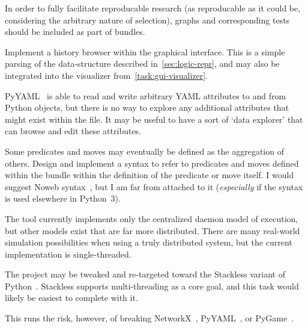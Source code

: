 \begin{task}
  \label{task:bundle-graphs}
  In order to fully facilitate reproducable research
    (as reproducable as it could be,
      considering the arbitrary nature of selection),
    graphs and corresponding tests should be included as part of bundles.
\end{task}

\begin{task}
  \label{task:save-history}
  Implement a history browser within the graphical interface.
  This is a simple parsing of the data-structure described in~\autoref{sec:logic-repr},
    and may also be integrated into the visualizer from~\autoref{task:gui-visualizer}.
\end{task}

\begin{task}
  \label{task:arbitrary-attributes}
  PyYAML~\autocite{pyyaml} is able to read and write arbitrary YAML
  attributes to and from Python objects, but there is no way to explore
  any additional attributes that might exist within the file.
  It may be useful to have a sort of \enquote*{data explorer} that can
    browse and edit these attributes.
\end{task}

\begin{task}
  \label{task:magical-references}
  Some predicates and moves may eventually be defined as the aggregation of others.
  Design and implement a syntax to refer to predicates and moves defined within the bundle
    within the definition of the predicate or move itself.
  I would suggest Noweb syntax~\autocite{noweb}, but I am far from attached to it
    (\emph{especially} if the syntax is used elsewhere in Python~3).
\end{task}

\begin{task}
  \label{task:stackless}
  The tool currently implements only the centralized daemon model of execution,
    but other models exist that are far more distributed.
  There are many real-world simulation possibilities when using a truly distributed system,
    but the current implementation is single-threaded.

  The project may be tweaked and re-targeted toward the Stackless variant of Python~\autocite{stackless}.
  Stackless supports multi-threading as a core goal, and this task would likely be easiest to complete with it.

  This runs the risk, however, of breaking NetworkX~\autocite{hagberg:networkx}, PyYAML~\autocite{pyyaml}, or PyGame~\autocite{pygame}.
\end{task}

